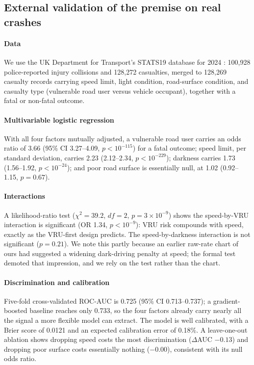\documentclass[journal]{IEEEtran}
\begin{document}
\subsection{External validation of the premise on real crashes}
\label{sec:ext-validation}

\paragraph{Data} We use the UK Department for Transport's STATS19 database for 2024 \cite{dft2024}: 100,928 police-reported injury collisions and 128,272 casualties, merged to 128,269 casualty records carrying speed limit, light condition, road-surface condition, and casualty type (vulnerable road user versus vehicle occupant), together with a fatal or non-fatal outcome.

\paragraph{Multivariable logistic regression} With all four factors mutually adjusted, a vulnerable road user carries an odds ratio of 3.66 (95\% CI 3.27--4.09, $p<10^{-115}$) for a fatal outcome; speed limit, per standard deviation, carries 2.23 (2.12--2.34, $p<10^{-229}$); darkness carries 1.73 (1.56--1.92, $p<10^{-24}$); and poor road surface is essentially null, at 1.02 (0.92--1.15, $p=0.67$).

\paragraph{Interactions} A likelihood-ratio test ($\chi^2=39.2$, $df=2$, $p=3\times10^{-9}$) shows the speed-by-VRU interaction is significant (OR 1.34, $p<10^{-9}$): VRU risk compounds with speed, exactly as the VRU-first design predicts. The speed-by-darkness interaction is not significant ($p=0.21$). We note this partly because an earlier raw-rate chart of ours had suggested a widening dark-driving penalty at speed; the formal test demoted that impression, and we rely on the test rather than the chart.

\paragraph{Discrimination and calibration} Five-fold cross-validated ROC-AUC is 0.725 (95\% CI 0.713--0.737); a gradient-boosted baseline reaches only 0.733, so the four factors already carry nearly all the signal a more flexible model can extract. The model is well calibrated, with a Brier score of 0.0121 and an expected calibration error of 0.18\%. A leave-one-out ablation shows dropping speed costs the most discrimination ($\Delta$AUC $-0.13$) and dropping poor surface costs essentially nothing ($-0.00$), consistent with its null odds ratio.
\end{document}

